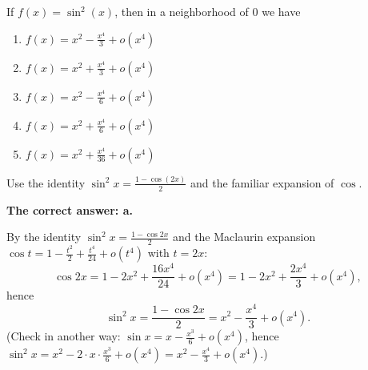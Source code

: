 
\begin{question}
If $f(x)=\sin^2(x)$, then in a neighborhood of $0$ we have
\begin{enumerate}
  \item $f(x)=x^2-\frac{x^4}{3}+o(x^4)$
  \item $f(x)=x^2+\frac{x^4}{3}+o(x^4)$
  \item $f(x)=x^2-\frac{x^4}{6}+o(x^4)$
  \item $f(x)=x^2+\frac{x^4}{6}+o(x^4)$
  \item $f(x)=x^2+\frac{x^4}{36}+o(x^4)$
\end{enumerate}
\end{question}

\begin{hint}
Use the identity $\sin^2x=\frac{1-\cos(2x)}{2}$ and the familiar expansion of $\cos$.
\end{hint}

\begin{solution}
\textbf{The correct answer: a.}

By the identity $\sin^2x=\frac{1-\cos 2x}{2}$ and the Maclaurin expansion $\cos t=1-\frac{t^2}{2}+\frac{t^4}{24}+o(t^4)$ with $t=2x$:
\[ \cos 2x=1-2x^2+\frac{16x^4}{24}+o(x^4)=1-2x^2+\frac{2x^4}{3}+o(x^4), \]
hence
\[ \sin^2x=\frac{1-\cos2x}{2}=x^2-\frac{x^4}{3}+o(x^4). \]
(Check in another way: $\sin x=x-\frac{x^3}{6}+o(x^4)$, hence $\sin^2x=x^2-2\cdot x\cdot\frac{x^3}{6}+o(x^4)=x^2-\frac{x^4}{3}+o(x^4)$.)
\end{solution}
